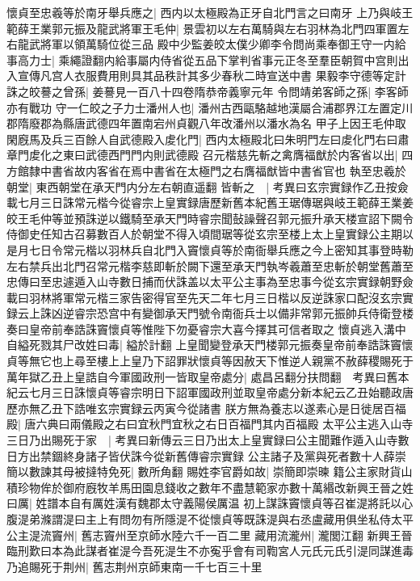 懷貞至忠羲等於南牙舉兵應之|{
	西内以太極殿為正牙自北門言之曰南牙}
上乃與岐王範薛王業郭元振及龍武將軍王毛仲|{
	景雲初以左右萬騎與左右羽林為北門四軍置左右龍武將軍以領萬騎位從三品}
殿中少監姜皎太僕少卿李令問尚乘奉御王守一内給事高力士|{
	乘繩證翻内給事屬内侍省從五品下掌判省事元正冬至羣臣朝賀中宫則出入宣傳凡宫人衣服費用則具其品秩計其多少春秋二時宣送中書}
果毅李守德等定計誅之皎謩之曾孫|{
	姜謩見一百八十四卷隋恭帝義寧元年}
令問靖弟客師之孫|{
	李客師亦有戰功}
守一仁皎之子力士潘州人也|{
	潘州古西甌駱越地漢屬合浦郡界江左置定川郡隋廢郡為縣唐武德四年置南宕州貞觀八年改潘州以潘水為名}
甲子上因王毛仲取閑廐馬及兵三百餘人自武德殿入䖍化門|{
	西内太極殿北曰朱明門左曰䖍化門右曰肅章門䖍化之東曰武德西門門内則武德殿}
召元楷慈先斬之禽膺福猷於内客省以出|{
	四方館隸中書省故内客省在焉中書省在太極門之右膺福猷皆中書省官也}
執至忠羲於朝堂|{
	東西朝堂在承天門内分左右朝直遥翻}
皆斬之　|{
	考異曰玄宗實録作乙丑按僉載七月三日誅常元楷今從睿宗上皇實録唐歷新舊本紀舊王琚傳琚與岐王範薛王業姜皎王毛仲等並預誅逆以鐵騎至承天門時睿宗聞鼔譟聲召郭元振升承天楼宣詔下闕令侍御史任知古召募數百人於朝堂不得入頃間琚等從玄宗至楼上太上皇實録公主期以是月七日令常元楷以羽林兵自北門入竇懷貞等於南衙舉兵應之今上密知其事登時勒左右禁兵出北門召常元楷李慈即斬於闕下還至承天門執岑羲蕭至忠斬於朝堂舊蕭至忠傳曰至忠遽遁入山寺數日捕而伏誅盖以太平公主事為至忠事今從玄宗實録朝野僉載曰羽林將軍常元楷三家告密得官至先天二年七月三日楷以反逆誅家口配沒玄宗實録云上誅凶逆睿宗恐宫中有變御承天門號令南衙兵士以備非常郭元振帥兵侍衛登楼奏曰皇帝前奉誥誅竇懷貞等惟陛下勿憂睿宗大喜今擇其可信者取之}
懷貞逃入溝中自縊死戮其尸改姓曰毒|{
	縊於計翻}
上皇聞變登承天門楼郭元振奏皇帝前奉誥誅竇懷貞等無它也上尋至樓上上皇乃下詔罪狀懷貞等因赦天下惟逆人親黨不赦薛稷賜死于萬年獄乙丑上皇誥自今軍國政刑一皆取皇帝處分|{
	處昌呂翻分扶問翻　考異曰舊本紀云七月三日誅懷貞等睿宗明日下詔軍國政刑並取皇帝處分新本紀云乙丑始聽政唐歷亦無乙丑下誥唯玄宗實録云丙寅今從諸書}
朕方無為養志以遂素心是日徙居百福殿|{
	唐六典曰兩儀殿之右曰宜秋門宜秋之右日百福門其内百福殿}
太平公主逃入山寺三日乃出賜死于家　|{
	考異曰新傳云三日乃出太上皇實録曰公主聞難作遁入山寺數日方出禁錮終身諸子皆伏誅今從新舊傳睿宗實録}
公主諸子及黨與死者數十人薛崇簡以數諫其母被撻特免死|{
	數所角翻}
賜姓李官爵如故|{
	崇簡即崇暕}
籍公主家財貨山積珍物侔於御府廐牧羊馬田園息錢收之數年不盡慧範家亦數十萬緡改新興王晉之姓曰厲|{
	姓譜本自有厲姓漢有魏郡太守義陽侯厲温}
初上謀誅竇懷貞等召崔湜將託以心腹湜弟滌謂湜曰主上有問勿有所隱湜不從懷貞等既誅湜與右丞盧藏用俱坐私侍太平公主湜流竇州|{
	舊志竇州至京師水陸六千一百二里}
藏用流瀧州|{
	瀧閭江翻}
新興王晉臨刑歎曰本為此謀者崔湜今吾死湜生不亦寃乎會有司鞫宮人元氏元氏引湜同謀進毒乃追賜死于荆州|{
	舊志荆州京師東南一千七百三十里}
